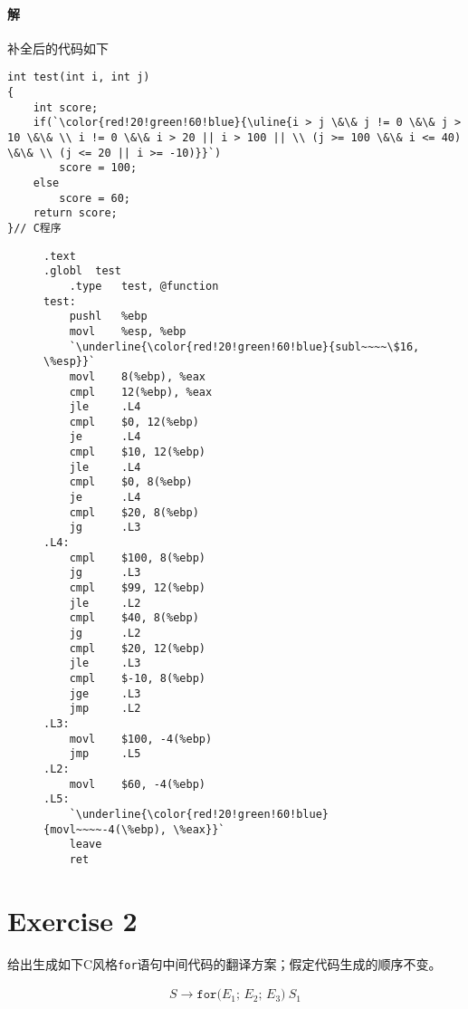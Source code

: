 \documentclass{article}
\begin{document}
\begin{multicols}{2}
    \paragraph{解}
    补全后的代码如下
    \begin{lstlisting}[style = C]
int test(int i, int j)
{
    int score;
    if(`\color{red!20!green!60!blue}{\uline{i > j \&\& j != 0 \&\& j > 10 \&\& \\ i != 0 \&\& i > 20 || i > 100 || \\ (j >= 100 \&\& i <= 40) \&\& \\ (j <= 20 || i >= -10)}}`)
        score = 100;
    else
        score = 60;
    return score;
}// C程序
    \end{lstlisting}


    \begin{figure}[H]
        \centering
        \begin{lstlisting}[style = Assembler, lineskip = 0.2em]
.text
.globl  test
    .type   test, @function
test:
    pushl   %ebp
    movl    %esp, %ebp
    `\underline{\color{red!20!green!60!blue}{subl~~~~\$16, \%esp}}`
    movl    8(%ebp), %eax
    cmpl    12(%ebp), %eax
    jle     .L4
    cmpl    $0, 12(%ebp)
    je      .L4
    cmpl    $10, 12(%ebp)
    jle     .L4
    cmpl    $0, 8(%ebp)
    je      .L4
    cmpl    $20, 8(%ebp)
    jg      .L3
.L4:
    cmpl    $100, 8(%ebp)
    jg      .L3
    cmpl    $99, 12(%ebp)
    jle     .L2
    cmpl    $40, 8(%ebp)
    jg      .L2
    cmpl    $20, 12(%ebp)
    jle     .L3
    cmpl    $-10, 8(%ebp)
    jge     .L3
    jmp     .L2
.L3:
    movl    $100, -4(%ebp)
    jmp     .L5
.L2:
    movl    $60, -4(%ebp)
.L5:
    `\underline{\color{red!20!green!60!blue}{movl~~~~-4(\%ebp), \%eax}}`
    leave
    ret
        \end{lstlisting}
    \end{figure}
\end{multicols}


\section*{Exercise 2}
给出生成如下C风格\lstinline{for}语句中间代码的翻译方案；假定代码生成的顺序不变。

\begin{align*}
    S \rightarrow \texttt{for(}E_1\texttt{; }E_2\texttt{; }E_3\texttt{)}\ S_1
\end{align*}
\end{document}
